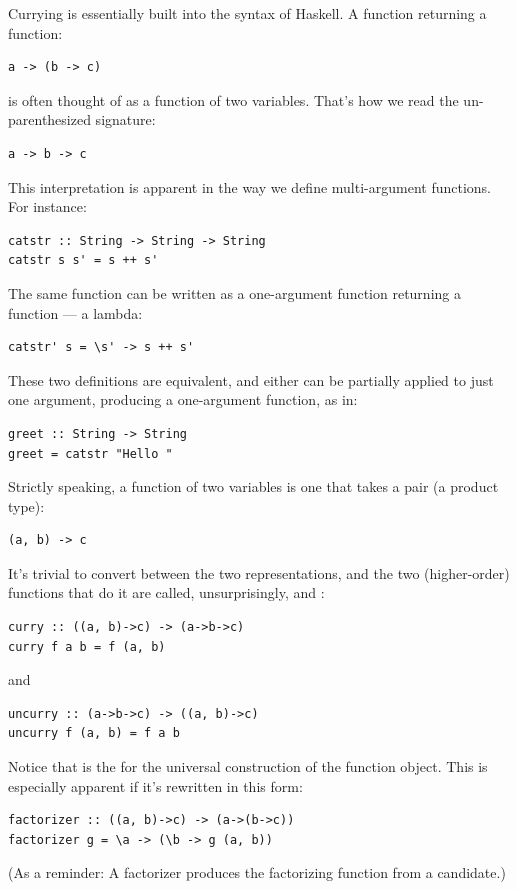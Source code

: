 Currying is essentially built into the syntax of Haskell. A function
returning a function:

\begin{verbatim}
a -> (b -> c)
\end{verbatim}
is often thought of as a function of two variables. That's how we read
the un-parenthesized signature:

\begin{verbatim}
a -> b -> c
\end{verbatim}
This interpretation is apparent in the way we define multi-argument
functions. For instance:

\begin{verbatim}
catstr :: String -> String -> String
catstr s s' = s ++ s'
\end{verbatim}
The same function can be written as a one-argument function returning a
function --- a lambda:

\begin{verbatim}
catstr' s = \s' -> s ++ s'
\end{verbatim}
These two definitions are equivalent, and either can be partially
applied to just one argument, producing a one-argument function, as in:

\begin{verbatim}
greet :: String -> String
greet = catstr "Hello "
\end{verbatim}
Strictly speaking, a function of two variables is one that takes a pair
(a product type):

\begin{verbatim}
(a, b) -> c
\end{verbatim}
It's trivial to convert between the two representations, and the two
(higher-order) functions that do it are called, unsurprisingly,
 and :

\begin{verbatim}
curry :: ((a, b)->c) -> (a->b->c)
curry f a b = f (a, b)
\end{verbatim}
and

\begin{verbatim}
uncurry :: (a->b->c) -> ((a, b)->c)
uncurry f (a, b) = f a b
\end{verbatim}
Notice that  is the  for the universal
construction of the function object. This is especially apparent if it's
rewritten in this form:

\begin{verbatim}
factorizer :: ((a, b)->c) -> (a->(b->c))
factorizer g = \a -> (\b -> g (a, b))
\end{verbatim}
(As a reminder: A factorizer produces the factorizing function from a
candidate.)

